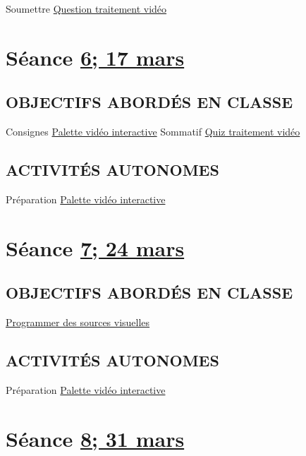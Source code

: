 \documentclass[
  french,
]{book}
\begin{document}
Soumettre \protect\hyperlink{sommatif_2}{Question traitement vidéo}

\hypertarget{semaine_7}{%
\section{\texorpdfstring{Séance \protect\hyperlink{semaine_7}{6; 17 mars}}{Séance 6; 17 mars}}\label{semaine_7}}

\hypertarget{objectifs-aborduxe9s-en-classe-6}{%
\subsection{OBJECTIFS ABORDÉS EN CLASSE}\label{objectifs-aborduxe9s-en-classe-6}}

Consignes \protect\hyperlink{sommatif_4}{Palette vidéo interactive}
Sommatif \protect\hyperlink{sommatif_3}{Quiz traitement vidéo}

\hypertarget{activituxe9s-autonomes-6}{%
\subsection{ACTIVITÉS AUTONOMES}\label{activituxe9s-autonomes-6}}

Préparation \protect\hyperlink{sommatif_4}{Palette vidéo interactive}

\hypertarget{semaine_8}{%
\section{\texorpdfstring{Séance \protect\hyperlink{semaine_8}{7; 24 mars}}{Séance 7; 24 mars}}\label{semaine_8}}

\hypertarget{objectifs-aborduxe9s-en-classe-7}{%
\subsection{OBJECTIFS ABORDÉS EN CLASSE}\label{objectifs-aborduxe9s-en-classe-7}}

\protect\hyperlink{programmer}{Programmer des sources visuelles}

\hypertarget{activituxe9s-autonomes-7}{%
\subsection{ACTIVITÉS AUTONOMES}\label{activituxe9s-autonomes-7}}

Préparation \protect\hyperlink{sommatif_4}{Palette vidéo interactive}

\hypertarget{semaine_9}{%
\section{\texorpdfstring{Séance \protect\hyperlink{semaine_9}{8; 31 mars}}{Séance 8; 31 mars}}\label{semaine_9}}
\end{document}
